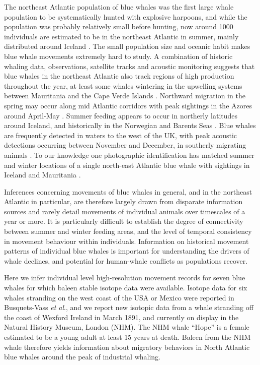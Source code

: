 \documentclass[a4paper,12pt]{article}
\begin{document}
The northeast Atlantic population of blue whales was the first large whale population to be systematically hunted with explosive harpoons, and while the population was probably relatively small before hunting, now around 1000 individuals are estimated to be in the northeast Atlantic in summer, mainly distributed around Iceland \cite{pike2009note}. 
The small population size and oceanic habit makes blue whale movements extremely hard to study. 
A combination of historic whaling data, observations, satellite tracks and acoustic monitoring suggests that blue whales in the northeast Atlantic also track regions of high production throughout the year, at least some whales wintering in the upwelling systems between Mauritania and the Cape Verde Islands \cite{baines2014upwellings}. 
Northward migration in the spring may occur along mid Atlantic corridors with peak sightings in the Azores around April-May \cite{silva2013north}. 
Summer feeding appears to occur in northerly latitudes around Iceland, and historically in the Norwegian and Barents Seas \cite{pike2009note}. 
Blue whales are frequently detected in waters to the west of the UK, with peak acoustic detections occurring between November and December, in southerly migrating animals \cite{reeves2004historical,baines2017autumn,charif2009acoustic,visser2011timing}.
To our knowledge one photographic identification has matched summer and winter locations of a single north-east Atlantic blue whale with sightings in Iceland and Mauritania \cite{poster}.

Inferences concerning movements of blue whales in general, and in the northeast Atlantic in particular, are therefore largely drawn from disparate information sources and rarely detail movements of individual animals over timescales of a year or more. 
It is particularly difficult to establish the degree of connectivity between summer and winter feeding areas, and the level of temporal consistency in movement behaviour within individuals. 
Information on historical movement patterns of individual blue whales is important for understanding the drivers of whale declines, and potential for human-whale conflicts as populations recover.

Here we infer individual level high-resolution movement records for seven blue whales for which baleen stable isotope data were available.
Isotope data for six whales stranding on the west coast of the USA or Mexico were reported in Busquets-Vass \textit{et al}.\cite{busquets2017estimating}, and we report new isotopic data from a whale stranding off the coast of Wexford Ireland in March 1891, and currently on display in the Natural History Museum, London (NHM).
The NHM whale ``Hope'' is a female estimated to be a young adult at least 15 years at death. 
Baleen from the NHM whale therefore yields information about migratory behaviors in North Atlantic blue whales around the peak of industrial whaling.
\end{document}
